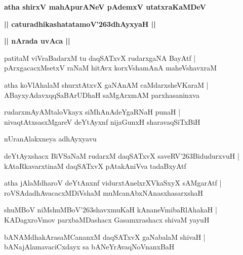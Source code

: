 \documentclass[twoside,12pt,openright]{book}
\def\S{\char'263}
\newcounter{shloka}[chapter]
\def\uvaca#1{\centerline{{\large\textbf{#1}}}}
\begin{document}
\begin{center}
{\LARGE\bfseries atha shirxV mahApurANeV pAdemxV utatxraKaMDeV}
\end{center}

\begin{center}
{\LARGE\bfseries || caturadhikashatatamoV\S dhAyxyaH || }
\end{center}

\uvaca{|| nArada uvAca ||}

\begin{shloka}%
patitaM viVraBadarxM tu daqSATxvX rudarxgaNA BayAtf |\\
pArxgacacxMsetxV raNaM hitAvx korxVshamAnA maheVshavxraM
\end{shloka}

\begin{shloka}%
atha koVlAhalaM shurxtAtxvX gaNAnAM caMdarxsheVKaraM |\\
ABayxyAdavxqqSaBArUDhaH saMgArxmAM parxhasaninxva
\end{shloka}

\begin{shloka}%
rudarxmAyAMtaloVkayx siMhAnAdeYgaRNaH punaH |\\
nivaqtAtxsasxMgareV deYtAyxnf nijaGunxH sharavaqSiTxBiH 
\end{shloka}

\begin{center}
nUranAlakxneya adhAyxyavu
\end{center}

\begin{shloka}%
deYtAyxshacx BiVSaNaM rudarxM daqSATxvX saveRV\S BidudurxvuH |\\
kAtaRkavarxtinaM daqSATxvX pAtakAniVva tadaBxyAtf 
\end{shloka}

\begin{shloka}%
atha jAlaMdharoV deYtAnxnf vidurxtAnelxrXVkaSxyX sAMgarAtf |\\
roVSAdadhAvacacxMDiVshaM muMcanAbxNAnasxhasarxshaH
\end{shloka}

\begin{shloka}%
shuMBoV niMshuMBoV\S shavxmuKaH kAnaneVmibaRlAhakaH |\\
KADagxroVmov parxbaMDashacx Gasamxrashacx shivaM yayuH 
\end{shloka}

\begin{shloka}%
bANAMdhakArasaMCananxM daqSATxvX gaNabalaM shivaH |\\
bANajAlamavaciCxdayx sa bANeYrAvaqNoVnanxBaH 
\end{shloka}
\end{document}
